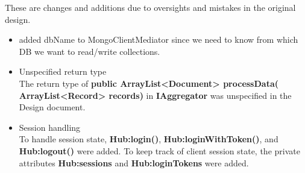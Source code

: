 \documentclass[oneside, english, final]{design}
\begin{document}
These are changes and additions due to oversights and mistakes in the original design.

\begin{itemize}
      \item{added dbName to MongoClientMediator since we need to know from which DB we want to read/write collections.}
            \\

      \item{Unspecified return type}
            \\
            The return type of \textsf{\textbf{public ArrayList<Document> processData( ArrayList<Record> records)}} in \textsf{\textbf{IAggregator}}
            was unspecified in the Design document.

      \item{Session handling}
            \\
            To handle session state, \textsf{\textbf{Hub:login()}}, \textsf{\textbf{Hub:loginWithToken()}}, and \textsf{\textbf{Hub:logout()}} were added.
            To keep track of client session state, the private attributes \textsf{\textbf{Hub:sessions}} and \textsf{\textbf{Hub:loginTokens}} were added.

\end{itemize}
\end{document}
